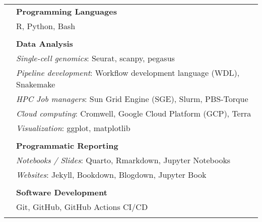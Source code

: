\documentclass[letterpaper, 11pt]{article}
\begin{document}
\begin{longtable}{p{1.6in}p{4.9in}}

{\color{OliveGreen}{Profficiencies / Skills}}
& \textbf{Programming Languages}\\
& R, Python, Bash \\
& \\

& \textbf{Data Analysis}\\
& \textit{Single-cell genomics}: Seurat, scanpy, pegasus \\
& \textit{Pipeline development}: Workflow development language (WDL), Snakemake \\
& \textit{HPC Job managers}: Sun Grid Engine (SGE), Slurm, PBS-Torque \\
& \textit{Cloud computing}: Cromwell, Google Cloud Platform (GCP), Terra \\
& \textit{Visualization}: ggplot, matplotlib \\
& \\ 

& \textbf{Programmatic Reporting}\\
& \textit{Notebooks / Slides}: Quarto, Rmarkdown, Jupyter Notebooks \\
& \textit{Websites}: Jekyll, Bookdown, Blogdown, Jupyter Book \\
& \\ 

& \textbf{Software Development}\\
& Git, GitHub, GitHub Actions CI/CD \\
& \\ 






\end{longtable}
\end{document}
